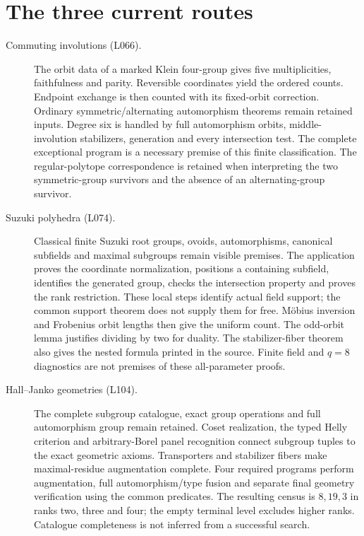 \documentclass[a4paper,11pt]{article}
\begin{document}
\section*{The three current routes}
\begin{description}
\item[Commuting involutions (L066).]
The orbit data of a marked Klein four-group gives five multiplicities,
faithfulness and parity. Reversible coordinates yield the ordered counts.
Endpoint exchange is then counted with its fixed-orbit correction. Ordinary
symmetric/alternating automorphism theorems remain retained inputs.
Degree six is handled by full automorphism orbits, middle-involution
stabilizers, generation and every intersection test. The complete exceptional
program is a necessary premise of this finite classification. The
regular-polytope correspondence is retained when interpreting the two
symmetric-group survivors and the absence of an alternating-group survivor.

\item[Suzuki polyhedra (L074).]
Classical finite Suzuki root groups, ovoids, automorphisms, canonical
subfields and maximal subgroups remain visible premises. The application
proves the coordinate normalization, positions a containing subfield,
identifies the generated group, checks the intersection property and proves
the rank restriction. These local steps identify actual field support;
the common support theorem does not supply them for free. Möbius inversion
and Frobenius orbit lengths then give the uniform count. The odd-orbit
lemma justifies dividing by two for duality. The stabilizer-fiber theorem
also gives the nested formula printed in the source. Finite field and
$q=8$ diagnostics are not premises of these all-parameter proofs.

\item[Hall--Janko geometries (L104).]
The complete subgroup catalogue, exact group operations and full
automorphism group remain retained. Coset realization, the typed Helly
criterion and arbitrary-Borel panel recognition connect subgroup tuples
to the exact geometric axioms. Transporters and stabilizer fibers make
maximal-residue augmentation complete. Four required programs perform
augmentation, full automorphism/type fusion and separate final geometry
verification using the common predicates. The resulting census is
$8,19,3$ in ranks two, three and four; the empty terminal level excludes
higher ranks. Catalogue completeness is not inferred from a successful
search.
\end{description}
\end{document}
